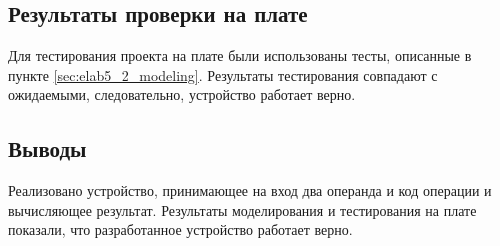 \subsection{Результаты проверки на плате}

Для тестирования проекта на плате были использованы тесты, описанные в пункте \ref{sec:elab5_2_modeling}. Результаты тестирования совпадают с ожидаемыми, следовательно, устройство работает верно.

\subsection{Выводы}

Реализовано устройство, принимающее на вход два операнда и код операции и вычисляющее результат. Результаты моделирования и тестирования на плате показали, что разработанное устройство работает верно.

